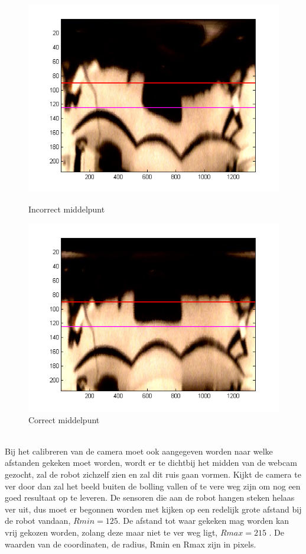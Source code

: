 \documentclass[a4paper]{article}
\begin{document}
\begin{figure}[htbp]
  \begin{minipage}[b]{0.5\linewidth}
    \centering
    \includegraphics[width=\linewidth]{img/incorrect_center.png}
    \caption{Incorrect middelpunt}
    \label{fig:incorrectcenter}
  \end{minipage}
  \hspace{0.5cm}
  \begin{minipage}[b]{0.5\linewidth}
    \centering
    \includegraphics[width=\linewidth]{img/correct_center.png}
    \caption{Correct middelpunt}
    \label{fig:correctcenter}
  \end{minipage}
\end{figure}
\\
Bij het calibreren van de camera moet ook aangegeven worden naar welke afstanden gekeken moet worden, wordt er te dichtbij het midden van de webcam gezocht, zal de robot zichzelf zien en zal dit ruis gaan vormen. Kijkt de camera te ver door dan zal het beeld buiten de bolling vallen of te vere weg zijn om nog een goed resultaat op te leveren. De sensoren die aan de robot hangen steken helaas ver uit, dus moet er begonnen worden met kijken op een redelijk grote afstand bij de robot vandaan, $Rmin = 125$. De afstand tot waar gekeken mag worden kan vrij gekozen worden, zolang deze maar niet te ver weg ligt, $Rmax = 215$ . De waarden van de coordinaten, de radius, Rmin en Rmax zijn in pixels.
\end{document}
